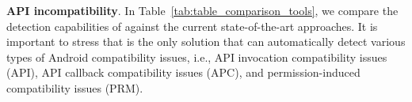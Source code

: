 \begin{comment}
These research efforts primarily focused on
behavioral differences when an app is installed on different
operating systems and/or hardware platforms.  They mainly
rely on hardware specifications and changes in the Android
documentation to uncover potential compatibility or
behavioral issues. Therefore, these approaches are not
useful when such platform related information is incomplete,
inconsistent, or unavailable.  Furthermore,  applying these
approaches to test an application on the entire vast
hardware ecosystem of Android devices may not be feasible
due to exponentially large system configurations.  Our work,
on the other hand, focuses on a more tractable and important
problem due to API evolution and how it can affect the apps
and their performance regardless of the operating system
distribution or the hardware the applications are running
on.

\end{comment}

\textbf{API incompatibility}. 
In Table~\ref{tab:table_comparison_tools}, we compare the
detection capabilities of \textsc{\@approach} against the
current state-of-the-art approaches. It is important to
stress that \@approach is the only solution that 
can automatically detect various types of
Android compatibility issues, i.e., API invocation
compatibility issues (API), API callback compatibility
issues (APC), and permission-induced compatibility issues
(PRM). %

\begin{table}%
    
    \vspace{-0.5cm}
\end{table}

